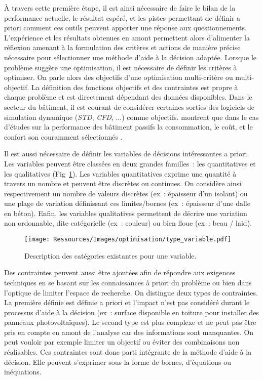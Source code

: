 À travers cette première étape, il est ainsi nécessaire de faire le bilan de la
performance actuelle, le résultat espéré, et les pistes permettant de définir a
priori comment ces outils peuvent apporter une réponse aux questionnements.
L’expérience et les résultats obtenues en amont permettent alors d’alimenter
la réflexion amenant à la formulation des critères et actions de manière précise
nécessaire pour sélectionner une méthode d’aide à la décision adaptée.
Lorsque le problème suggère une optimisation, il est nécessaire de définir les critères
à optimiser. On parle alors des objectifs d’une optimisation multi-critère ou multi-objectif.
La définition des fonctions objectifs et des contraintes est propre à chaque problème
et est directement dépendant des données disponibles.
Dans le secteur du bâtiment, il est courant de considérer certaines sorties des
logiciels de simulation dynamique (\textit{STD}, \textit{CFD}, ...) comme objectifs.
 montrent que dans le cas d’études sur la
performance des bâtiment passifs la consommation, le coût, et le confort son
couramment sélectionnés .

Il est aussi nécessaire de définir les variables de décisions intéressantes a priori.
Les variables peuvent être classées en deux grandes familles~: les quantitatives et
les qualitatives (Fig~\ref{fig:type_variable}).
Les variables quantitatives exprime une quantité à travers un nombre et
peuvent être discrètes ou continues. On considère ainsi respectivement un nombre de
valeurs discrètes (ex~: épaisseur d’un isolant) ou une plage de variation définissant
ces limites/bornes (ex~: épaisseur d’une dalle en béton).
Enfin, les variables qualitatives permettent de décrire une variation non ordonnable,
dite catégorielle (ex~: couleur) ou bien floue (ex~: beau / laid).

\begin{figure}
    \begin{center}
        \texttt{[image: Ressources/Images/optimisation/type\_variable.pdf]}
    \end{center}
    \caption{Description des catégories existantes pour une variable.
             \label{fig:type_variable}}
\end{figure}

Des contraintes peuvent aussi être ajoutées afin de répondre aux exigences
techniques en se basant sur les connaissances à priori du problème ou bien dans
l’optique de limiter l’espace de recherche. On distingue deux types de contraintes.
La première définie est définie a priori et l’impact n’est pas considéré durant le processus
d’aide à la décision (ex~: surface disponible en toiture pour installer des
panneaux photovoltaïques).
Le second type est plus complexe et ne peut pas être pris en compte en amont de
l’analyse car des informations sont manquantes. On peut vouloir par exemple limiter
un objectif ou éviter des combinaisons non réalisables. Ces contraintes sont donc
parti intégrante de la méthode d’aide à la décision.
Elle peuvent s’exprimer sous la forme de bornes, d’équations ou inéquations.

